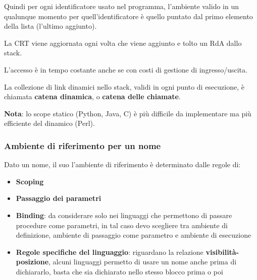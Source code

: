 \documentclass[12pt,a4paper]{article}
\begin{document}
Quindi per ogni identificatore usato nel programma, l'ambiente valido in un qualunque momento per quell'identificatore è quello puntato dal primo elemento della lista (l'ultimo aggiunto).

La CRT viene aggiornata ogni volta che viene aggiunto e tolto un RdA dallo stack.

L'accesso è in tempo costante anche se con costi di gestione di ingresso\slash uscita.

La collezione di link dinamici nello stack, validi in ogni punto di esecuzione, è chiamata \textbf{catena dinamica}, o \textbf{catena delle chiamate}.

\begin{figure}[h!]
	\begin{center}
	\end{center}
\end{figure}

\textbf{Nota}: lo scope statico (Python, Java, C) è più difficile da implementare ma più efficiente del dinamico (Perl).

\clearpage

\subsubsection{Ambiente di riferimento per un nome}
Dato un nome, il suo l'ambiente di riferimento è determinato dalle regole di:

\begin{itemize}
\item \textbf{Scoping}
\item \textbf{Passaggio dei parametri}
\item \textbf{Binding}: da considerare solo nei linguaggi che permettono di passare procedure come parametri, in tal caso devo scegliere tra ambiente di definizione, ambiente di passaggio come parametro e ambiente di esecuzione
\item \textbf{Regole specifiche del linguaggio}: riguardano la relazione \textbf{visibilità-posizione}, alcuni linguaggi permetto di usare un nome anche prima di dichiararlo, basta che sia dichiarato nello stesso blocco prima o poi
\end{itemize}
\end{document}
